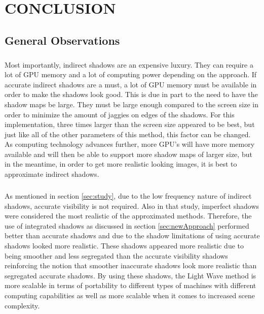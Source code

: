 \chapter{CONCLUSION}

\section{General Observations}
\paragraph{}
Most importantly, indirect shadows are an expensive luxury.  They can require a lot of GPU memory and a lot of computing power depending on the approach.  If accurate indirect shadows are a must, a lot of GPU memory must be available in order to make the shadows look good.  This is due in part to the need to have the shadow maps be large.  They must be large enough compared to the screen size in order to minimize the amount of jaggies on edges of the shadows.  For this implementation, three times larger than the screen size appeared to be best, but just like all of the other parameters of this method, this factor can be changed.  As computing technology advances further, more GPU's will have more memory available and will then be able to support more shadow maps of larger size, but in the meantime, in order to get more realistic looking images, it is best to approximate indirect shadows.

\paragraph{}
As mentioned in section \ref{sec:study}, due to the low frequency nature of indirect shadows, accurate visibility is not required.  Also in that study, imperfect shadows were considered the most realistic of the approximated methods.  Therefore, the use of integrated shadows as discussed in section \ref{sec:newApproach} performed better than accurate shadows and due to the shadow limitations of using accurate shadows looked more realistic.  These shadows appeared more realistic due to being smoother and less segregated than the accurate visibility shadows reinforcing the notion that smoother inaccurate shadows look more realistic than segregated accurate shadows.  By using these shadows, the Light Wave method is more scalable in terms of portability to different types of machines with different computing capabilities as well as more scalable when it comes to increased scene complexity.

